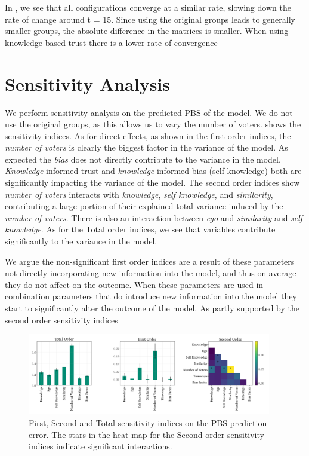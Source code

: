 In , we see that all configurations converge at a
similar rate, slowing down the rate of change around t = 15. Since using the
original groups leads to generally smaller groups, the absolute difference in
the matrices is smaller. When using knowledge-based trust there is a lower rate
of convergence




\section{Sensitivity Analysis} We perform sensitivity analysis on the predicted
PBS of the model. We do not use the original groups, as this allows us to vary
the number of voters.  shows the sensitivity indices.
As for direct effects, as shown in the first order indices, the \textit{number
	of voters} is clearly the biggest factor in the variance of the model. As
expected the \textit{bias} does not directly contribute to the variance in the
model. \textit{Knowledge} informed trust and\textit{ knowledge} informed bias
(self knowledge) both are significantly impacting the variance of the model.
The second order indices show \textit{number of voters} interacts with
\textit{knowledge}, \textit{self knowledge}, and\textit{ similarity},
contributing a large portion of their explained total variance induced by the
\textit{number of voters}. There is also an interaction between \textit{ego}
and \textit{similarity} and \textit{self knowledge}. As for the Total order
indices, we see that variables contribute significantly to the variance in the
model.

We argue the non-significant first order indices are a result of these
parameters not directly incorporating new information into the model, and thus
on average they do not affect on the outcome. When these parameters are used in
combination parameters that do introduce new information into the model they
start to significantly alter the outcome of the model. As partly supported by
the second order sensitivity indices

\begin{figure}[ht]
	\begin{center}
		\includegraphics[width=0.95\textwidth]{Figures/senstivity_analysis.png}
	\end{center}
	\caption{First, Second and Total sensitivity indices on the PBS prediction error. The stars in the heat map for the Second order sensitivity indices indicate significant interactions. }\label{fig:sensitivty_pbs}
\end{figure}


